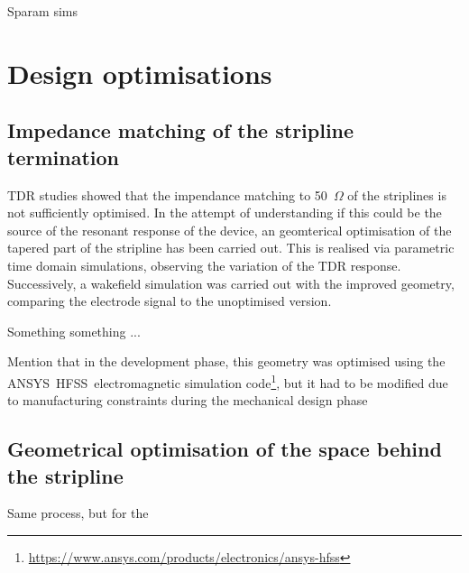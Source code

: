 Sparam sims





\section[Design ptimisations]{Design optimisations}

\subsection[Impedance matching of the stripline termination]{Impedance matching of the stripline termination}

TDR studies showed that the impendance matching to 50~$\Omega$ of the striplines is not sufficiently optimised. In the attempt of understanding if this could be the source of the resonant response of the device, an geomterical optimisation of the tapered part of the stripline has been carried out. This is realised via parametric time domain simulations, observing the variation of the TDR response. Successively, a wakefield simulation was carried out with the improved geometry, comparing the electrode signal to the unoptimised version.

Something something ...

Mention that in the development phase, this geometry was optimised using the ANSYS\textregistered~HFSS\texttrademark~electromagnetic simulation code\footnote{\url{https://www.ansys.com/products/electronics/ansys-hfss}}, but it had to be modified due to manufacturing constraints during the mechanical design phase\cite{Victor:private-comm}


\subsection[Geometrical optimisation of the space behind the stripline]{Geometrical optimisation of the space behind the stripline}

Same process, but for the
